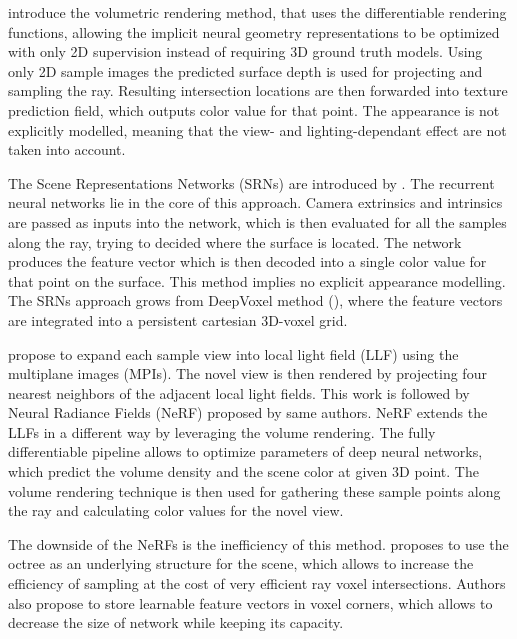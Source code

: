 \cite{niemeyer2020differentiable} introduce the volumetric rendering method,
that uses the differentiable rendering functions,
allowing the implicit neural geometry representations to be optimized
with only 2D supervision instead of requiring 3D ground truth models.
Using only 2D sample images the predicted surface depth is used
for projecting and sampling the ray.
Resulting intersection locations are then forwarded into texture prediction field,
which outputs color value for that point.
The appearance is not explicitly modelled, meaning that the view- and lighting-dependant effect are not taken into account.


The Scene Representations Networks (SRNs) are introduced by \cite{sitzmann2019srns}.
The recurrent neural networks lie in the core of this approach.
Camera extrinsics and intrinsics are passed as inputs into the network,
which is then evaluated for all the samples along the ray,
trying to decided where the surface is located.
The network produces the feature vector which is then decoded into a single color value for that point on the surface.
This method implies no explicit appearance modelling.
The SRNs approach grows from DeepVoxel method (\cite{sitzmann2019deepvoxels}),
where the feature vectors are integrated into a persistent cartesian 3D-voxel grid.

\cite{mildenhall2019local} propose to expand each sample view into local light field (LLF) using the multiplane images (MPIs).
The novel view is then rendered by projecting four nearest neighbors of the adjacent local light fields.
This work is followed by Neural Radiance Fields (NeRF) \cite{mildenhall2020nerf} proposed by same authors.
NeRF extends the LLFs in a different way by leveraging the volume rendering.
The fully differentiable pipeline allows to optimize parameters of deep neural networks,
which predict the volume density and the scene color at given 3D point.
The volume rendering technique is then used for gathering these sample points along the ray
and calculating color values for the novel view.

The downside of the NeRFs is the inefficiency of this method.
\cite{liu2021neural} proposes to use the octree as an underlying structure for the scene,
which allows to increase the efficiency of sampling at the cost of very efficient ray voxel intersections.
Authors also propose to store learnable feature vectors in voxel corners,
which allows to decrease the size of network while keeping its capacity.

